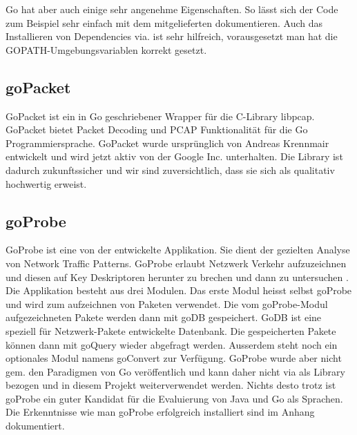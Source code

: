 Go hat aber auch einige sehr angenehme Eigenschaften. So lässt sich der Code zum Beispiel sehr einfach mit dem mitgelieferten  dokumentieren. Auch das Installieren von Dependencies via.  ist sehr hilfreich, vorausgesetzt man hat die GOPATH-Umgebungsvariablen korrekt gesetzt.

\subsection{goPacket}
GoPacket ist ein in Go geschriebener Wrapper für die C-Library libpcap. GoPacket bietet Packet Decoding und \acs{PCAP} Funktionalität für die Go Programmiersprache\cite[:4]{goPacket}. GoPacket wurde ursprünglich von Andreas Krennmair entwickelt und wird jetzt aktiv von der Google Inc. unterhalten. Die Library ist dadurch zukunftssicher und wir sind zuversichtlich, dass sie sich als qualitativ hochwertig erweist.

\subsection{goProbe}
GoProbe ist eine von der \osag{} entwickelte Applikation. Sie dient der gezielten Analyse von Network Traffic Patterns. GoProbe erlaubt Netzwerk Verkehr aufzuzeichnen und diesen auf Key Deskriptoren herunter zu brechen und dann zu untersuchen \cite[:2]{readme_goProbe}. 
Die Applikation besteht aus drei Modulen. Das erste Modul heisst selbst goProbe und wird zum aufzeichnen von Paketen verwendet. Die vom goProbe-Modul aufgezeichneten Pakete werden dann mit goDB gespeichert. GoDB ist eine speziell für Netzwerk-Pakete entwickelte Datenbank. Die gespeicherten Pakete können dann mit goQuery wieder abgefragt werden. Ausserdem steht noch ein optionales Modul namens goConvert zur Verfügung. GoProbe wurde aber nicht gem. den Paradigmen von Go veröffentlich und kann daher nicht via  als Library bezogen und in diesem Projekt weiterverwendet werden. Nichts desto trotz ist goProbe ein guter Kandidat für die Evaluierung von Java und Go als Sprachen. Die Erkenntnisse wie man goProbe erfolgreich installiert sind im Anhang dokumentiert.